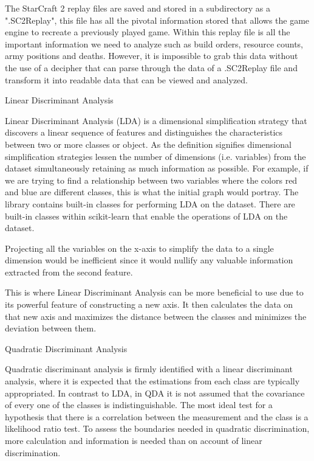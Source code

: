 \documentclass[a4paper,12pt]{report}
\begin{document}
The StarCraft 2 replay files are saved and stored in a subdirectory as a ".SC2Replay", this file has all the pivotal information stored that allows the game engine to recreate a previously played game. Within this replay file is all the important information we need to analyze such as build orders, resource counts, army positions and deaths. However, it is impossible to grab this data without the use of a decipher that can parse through the data of a .SC2Replay file and transform it into readable data that can be viewed and analyzed.

Linear Discriminant Analysis
 
Linear Discriminant Analysis (LDA) is a dimensional simplification strategy that discovers a linear sequence of features and distinguishes the characteristics between two or more classes or object. As the definition signifies dimensional simplification strategies lessen the number of dimensions (i.e. variables) from the dataset simultaneously retaining as much information as possible. For example, if we are trying to find a relationship between two variables where the colors red and blue are different classes, this is what the initial graph would portray. The library contains built-in classes for performing LDA on the dataset. There are built-in classes within scikit-learn that enable the operations of LDA on the dataset.


Projecting all the variables on the x-axis to simplify the data to a single dimension would be inefficient since it would nullify any valuable information extracted from the second feature.




This is where Linear Discriminant Analysis can be more beneficial to use due to its powerful feature of constructing a new axis. It then calculates the data on that new axis and maximizes the distance between the classes and minimizes the deviation between them. 











Quadratic Discriminant Analysis
 
Quadratic discriminant analysis is firmly identified with a linear discriminant analysis, where it is expected that the estimations from each class are typically appropriated. In contrast to LDA, in QDA it is not assumed that the covariance of every one of the classes is indistinguishable. The most ideal test for a hypothesis that there is a correlation between the measurement and the class is a likelihood ratio test. To assess the boundaries needed in quadratic discrimination, more calculation and information is needed than on account of linear discrimination.
\end{document}

